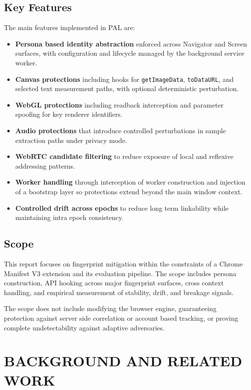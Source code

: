 \documentclass[11pt]{report}
\begin{document}
\section{Key Features}

The main features implemented in PAL are:

\begin{itemize}
    \item \textbf{Persona based identity abstraction} enforced across Navigator and Screen surfaces, with configuration and lifecycle managed by the background service worker.
    \item \textbf{Canvas protections} including hooks for \texttt{getImageData}, \texttt{toDataURL}, and selected text measurement paths, with optional deterministic perturbation.
    \item \textbf{WebGL protections} including readback interception and parameter spoofing for key renderer identifiers.
    \item \textbf{Audio protections} that introduce controlled perturbations in sample extraction paths under privacy mode.
    \item \textbf{WebRTC candidate filtering} to reduce exposure of local and reflexive addressing patterns.
    \item \textbf{Worker handling} through interception of worker construction and injection of a bootstrap layer so protections extend beyond the main window context.
    \item \textbf{Controlled drift across epochs} to reduce long term linkability while maintaining intra epoch consistency.
\end{itemize}

\section{Scope}

This report focuses on fingerprint mitigation within the constraints of a Chrome Manifest V3 extension and its evaluation pipeline. The scope includes persona construction, API hooking across major fingerprint surfaces, cross context handling, and empirical measurement of stability, drift, and breakage signals.

The scope does not include modifying the browser engine, guaranteeing protection against server side correlation or account based tracking, or proving complete undetectability against adaptive adversaries.


\chapter{BACKGROUND AND RELATED WORK}
\end{document}
